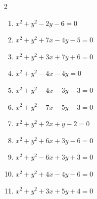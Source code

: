 \begin{multicols}{2}
\begin{enumerate}
  \item $x^{2}+y^{2}-2y-6=0$


  \item $x^{2}+y^{2}+7x-4y-5=0$


  \item $x^{2}+y^{2}+3x+7y+6=0$


  \item $x^{2}+y^{2}-4x-4y=0$


  \item $x^{2}+y^{2}-4x-3y-3=0$


  \item $x^{2}+y^{2}-7x-5y-3=0$


  \item $x^{2}+y^{2}+2x+y-2=0$


  \item $x^{2}+y^{2}+6x+3y-6=0$


  \item $x^{2}+y^{2}-6x+3y+3=0$


  \item $x^{2}+y^{2}+4x-4y-6=0$


  \item $x^{2}+y^{2}+3x+5y+4=0$


\end{enumerate}
\end{multicols}
